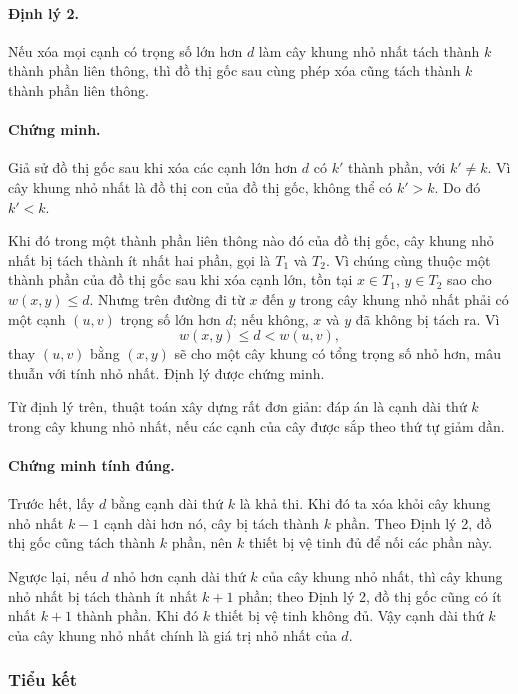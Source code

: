 \documentclass[11pt]{article}
\begin{document}
\paragraph{Định lý 2.}
Nếu xóa mọi cạnh có trọng số lớn hơn $d$ làm cây khung nhỏ nhất tách thành
$k$ thành phần liên thông, thì đồ thị gốc sau cùng phép xóa cũng tách thành
$k$ thành phần liên thông.

\paragraph{Chứng minh.}
Giả sử đồ thị gốc sau khi xóa các cạnh lớn hơn $d$ có $k'$ thành phần, với
$k'\ne k$. Vì cây khung nhỏ nhất là đồ thị con của đồ thị gốc, không thể có
$k'>k$. Do đó $k'<k$.

Khi đó trong một thành phần liên thông nào đó của đồ thị gốc, cây khung nhỏ
nhất bị tách thành ít nhất hai phần, gọi là $T_1$ và $T_2$. Vì chúng cùng
thuộc một thành phần của đồ thị gốc sau khi xóa cạnh lớn, tồn tại
$x\in T_1$, $y\in T_2$ sao cho $w(x,y)\le d$. Nhưng trên đường đi từ $x$ đến
$y$ trong cây khung nhỏ nhất phải có một cạnh $(u,v)$ trọng số lớn hơn $d$;
nếu không, $x$ và $y$ đã không bị tách ra. Vì
\[
  w(x,y)\le d < w(u,v),
\]
thay $(u,v)$ bằng $(x,y)$ sẽ cho một cây khung có tổng trọng số nhỏ hơn, mâu
thuẫn với tính nhỏ nhất. Định lý được chứng minh.

Từ định lý trên, thuật toán xây dựng rất đơn giản: đáp án là cạnh dài thứ $k$
trong cây khung nhỏ nhất, nếu các cạnh của cây được sắp theo thứ tự giảm dần.

\paragraph{Chứng minh tính đúng.}
Trước hết, lấy $d$ bằng cạnh dài thứ $k$ là khả thi. Khi đó ta xóa khỏi cây
khung nhỏ nhất $k-1$ cạnh dài hơn nó, cây bị tách thành $k$ phần. Theo Định
lý 2, đồ thị gốc cũng tách thành $k$ phần, nên $k$ thiết bị vệ tinh đủ để nối
các phần này.

Ngược lại, nếu $d$ nhỏ hơn cạnh dài thứ $k$ của cây khung nhỏ nhất, thì cây
khung nhỏ nhất bị tách thành ít nhất $k+1$ phần; theo Định lý 2, đồ thị gốc
cũng có ít nhất $k+1$ thành phần. Khi đó $k$ thiết bị vệ tinh không đủ. Vậy
cạnh dài thứ $k$ của cây khung nhỏ nhất chính là giá trị nhỏ nhất của $d$.

\subsubsection*{Tiểu kết}
\end{document}
